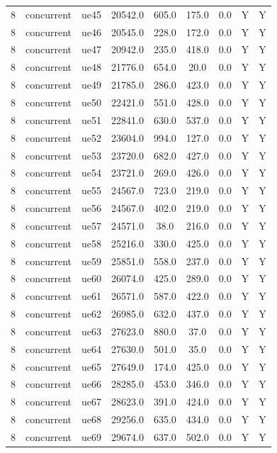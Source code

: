 \begin{table}[ht]
\begin{tabular}{|c|c|c|c|c|c|c|c|c|}
8 & concurrent & ue45 & 20542.0 & 605.0 & 175.0 & 0.0 & Y & Y \\
8 & concurrent & ue46 & 20545.0 & 228.0 & 172.0 & 0.0 & Y & Y \\
8 & concurrent & ue47 & 20942.0 & 235.0 & 418.0 & 0.0 & Y & Y \\
8 & concurrent & ue48 & 21776.0 & 654.0 & 20.0 & 0.0 & Y & Y \\
8 & concurrent & ue49 & 21785.0 & 286.0 & 423.0 & 0.0 & Y & Y \\
8 & concurrent & ue50 & 22421.0 & 551.0 & 428.0 & 0.0 & Y & Y \\
8 & concurrent & ue51 & 22841.0 & 630.0 & 537.0 & 0.0 & Y & Y \\
8 & concurrent & ue52 & 23604.0 & 994.0 & 127.0 & 0.0 & Y & Y \\
8 & concurrent & ue53 & 23720.0 & 682.0 & 427.0 & 0.0 & Y & Y \\
8 & concurrent & ue54 & 23721.0 & 269.0 & 426.0 & 0.0 & Y & Y \\
8 & concurrent & ue55 & 24567.0 & 723.0 & 219.0 & 0.0 & Y & Y \\
8 & concurrent & ue56 & 24567.0 & 402.0 & 219.0 & 0.0 & Y & Y \\
8 & concurrent & ue57 & 24571.0 & 38.0 & 216.0 & 0.0 & Y & Y \\
8 & concurrent & ue58 & 25216.0 & 330.0 & 425.0 & 0.0 & Y & Y \\
8 & concurrent & ue59 & 25851.0 & 558.0 & 237.0 & 0.0 & Y & Y \\
8 & concurrent & ue60 & 26074.0 & 425.0 & 289.0 & 0.0 & Y & Y \\
8 & concurrent & ue61 & 26571.0 & 587.0 & 422.0 & 0.0 & Y & Y \\
8 & concurrent & ue62 & 26985.0 & 632.0 & 437.0 & 0.0 & Y & Y \\
8 & concurrent & ue63 & 27623.0 & 880.0 & 37.0 & 0.0 & Y & Y \\
8 & concurrent & ue64 & 27630.0 & 501.0 & 35.0 & 0.0 & Y & Y \\
8 & concurrent & ue65 & 27649.0 & 174.0 & 425.0 & 0.0 & Y & Y \\
8 & concurrent & ue66 & 28285.0 & 453.0 & 346.0 & 0.0 & Y & Y \\
8 & concurrent & ue67 & 28623.0 & 391.0 & 424.0 & 0.0 & Y & Y \\
8 & concurrent & ue68 & 29256.0 & 635.0 & 434.0 & 0.0 & Y & Y \\
8 & concurrent & ue69 & 29674.0 & 637.0 & 502.0 & 0.0 & Y & Y \\

\end{tabular}
\end{table}
